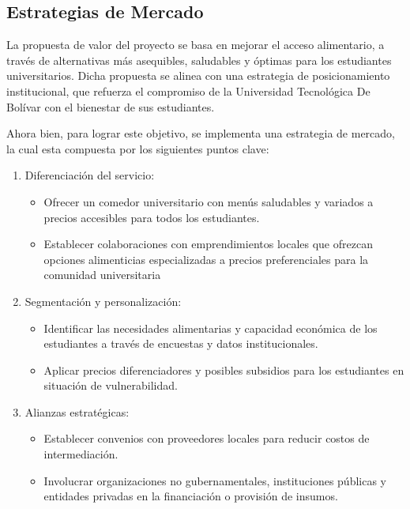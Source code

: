 \documentclass[letterpaper, 11pt]{report}
\begin{document}
\subsection{Estrategias de Mercado}

La propuesta de valor del proyecto se basa en mejorar el acceso alimentario, a
través de alternativas más asequibles, saludables y óptimas para los
estudiantes universitarios. Dicha propuesta se alinea con una estrategia de
posicionamiento institucional, que refuerza el compromiso de la Universidad
Tecnológica De Bolívar con el bienestar de sus estudiantes.

Ahora bien, para lograr este objetivo, se implementa una estrategia de mercado,
la cual esta compuesta por los siguientes puntos clave:

\begin{enumerate}
      \item Diferenciación del servicio: \begin{itemize}
                  \item Ofrecer un comedor universitario con menús saludables y variados a precios
                        accesibles para todos los estudiantes.
                  \item Establecer colaboraciones con emprendimientos locales que ofrezcan opciones
                        alimenticias especializadas a precios preferenciales para la comunidad
                        universitaria
            \end{itemize}

      \item Segmentación y personalización: \begin{itemize}
                  \item Identificar las necesidades alimentarias y capacidad económica de los
                        estudiantes a través de encuestas y datos institucionales.
                  \item Aplicar precios diferenciadores y posibles subsidios para los estudiantes en
                        situación de vulnerabilidad.
            \end{itemize}

      \item Alianzas estratégicas: \begin{itemize}
                  \item Establecer convenios con proveedores locales para reducir costos de
                        intermediación.
                  \item Involucrar organizaciones no gubernamentales, instituciones públicas y
                        entidades privadas en la financiación o provisión de insumos.


\end{itemize}
\end{enumerate}
\end{document}
